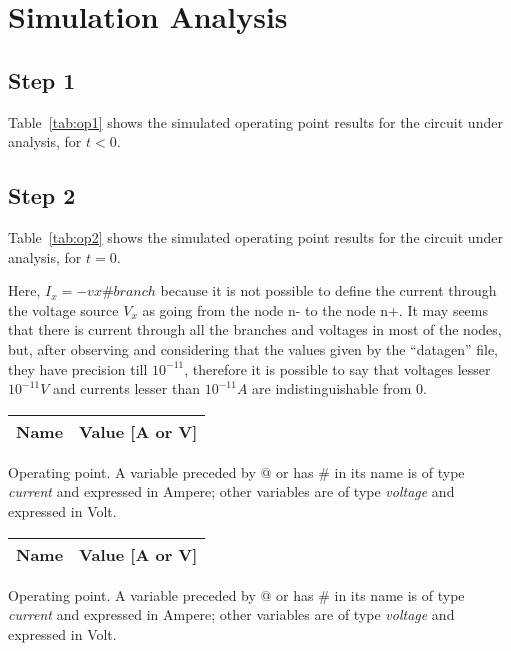 \section{Simulation Analysis}
\label{sec:simulation}

\subsection{Step 1}

Table~\ref{tab:op1} shows the simulated operating point results for the circuit
under analysis, for $t<0$. 


\subsection{Step 2}

Table~\ref{tab:op2} shows the simulated operating point results for the circuit
under analysis, for $t=0$. 

Here, $I_x = -vx\#branch$ because it is not possible to define the current through the voltage source $V_x$ as going from the node n- to the node n+. It may seems that there is current through all the branches and voltages in most of the nodes, but, after observing and considering that the values given by the ``datagen'' file, they have precision till $10^{-11}$, therefore it is possible to say that voltages lesser $10^{-11} V$ and currents lesser than $10^{-11} A$ are indistinguishable from 0.\\


\begin{minipage}[b]{0.46\textwidth}
\centering
   \begin{tabular}{|l|r|}
    \hline    
    {\bf Name} & {\bf Value [A or V]} \\ \hline
    
   \end{tabular}
    \captionsetup{type=table}   
  \caption{Operating point. A variable preceded by @ or has \# in its name is of type {\em current}
    and expressed in Ampere; other variables are of type {\it voltage} and expressed in
    Volt.}
  \label{tab:op1}
\end{minipage}
\hfill
\begin{minipage}[b]{0.46\textwidth}
\centering
  \begin{tabular}{|l|r|}
    \hline    
    {\bf Name} & {\bf Value [A or V]} \\ \hline
    
  \end{tabular}
    \captionsetup{type=table}   
  \caption{Operating point. A variable preceded by @ or has \# in its name is of type {\em current}
    and expressed in Ampere; other variables are of type {\it voltage} and expressed in
    Volt.}
  \label{tab:op2}
\end{minipage}



